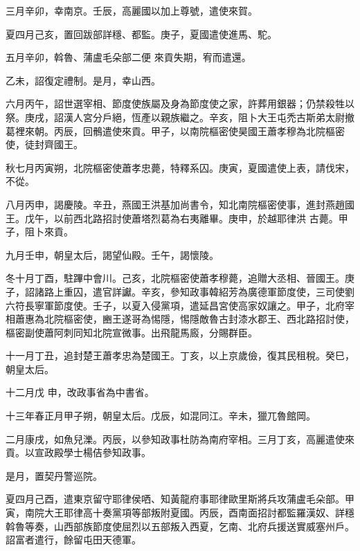 \begin{pinyinscope}
 三月辛卯，幸南京。壬辰，高麗國以加上尊號，遣使來賀。



 夏四月己亥，置回跋部詳穩、都監。庚子，夏國遣使進馬、駝。



 五月辛卯，斡魯、蒲盧毛朵部二便
 來貢失期，宥而遣還。



 乙未，詔復定禮制。是月，幸山西。



 六月丙午，詔世選宰相、節度使族屬及身為節度使之家，許葬用銀器；仍禁殺牲以祭。庚戌，詔漢人宮分戶絕，恆產以親族繼之。辛亥，阻卜大王屯禿古斯弟太尉撤葛裡來朝。丙辰，回鶻遣使來貢。甲子，以南院樞密使昊國王蕭孝穆為北院樞密使，徒封齊國王。



 秋七月丙寅朔，北院樞密使蕭孝忠薨，特釋系囚。庚寅，夏國遣使上表，請伐宋，不從。



 八月丙申，謁慶陵。辛丑，燕國王洪基加尚書令，知北南院樞密使事，進封燕趙國王。戊午，以前西北路招討使蕭塔烈葛為右夷離畢。庚申，於越耶律洪
 古薨。甲子，阻卜來貢。



 九月壬申，朝皇太后，謁望仙殿。壬午，謁懷陵。



 冬十月丁酉，駐蹕中會川。己亥，北院樞密使蕭孝穆薨，追贈大丞相、晉國王。庚子，詔諸路上重囚，遣官詳讞。辛亥，參知政事韓紹芳為廣德軍節度使，三司使劉六符長寧軍節度使。壬子，以夏入侵黨項，遣延昌宮使高家奴讓之。甲子，北府宰相蕭惠為北院樞密使，豳王遂哥為惕隱，惕隱敵魯古封漆水郡王、西北路招討使，樞密副使蕭阿刺同知北院宣微事。出飛龍馬廄，分賜群臣。



 十一月丁丑，追封楚王蕭孝忠為楚國王。丁亥，以上京歲儉，復其民租稅。癸巳，朝皇太后。



 十二月戊
 申，改政事省為中書省。



 十三年春正月甲子朔，朝皇太后。戊辰，如混同江。辛未，獵兀魯館岡。



 二月康戌，如魚兒濼。丙辰，以參知政事杜防為南府宰相。三月丁亥，高麗遣使來貢。以宣政殿學士楊佶參知政事。



 是月，置契丹警巡院。



 夏四月己酉，遣東京留守耶律侯哂、知黃龍府事耶律歐里斯將兵攻蒲盧毛朵部。甲寅，南院大王耶律高十奏黨項等部叛附夏國。丙辰，酉南面招討都監羅漢奴、詳穩斡魯等奏，山西部族節度使屈烈以五部叛入西夏，乞南、北府兵援送實威塞州戶。詔富者遣行，餘留屯田天德軍。




\end{pinyinscope}
